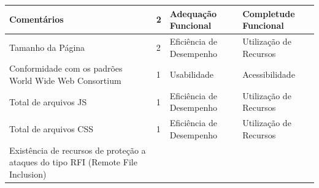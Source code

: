 \begin{apendicesenv}
\begin{longtable}{|p{175pt}|p{18pt}|p{110pt}|p{120pt}|}
 {\raggedright {Comentários}}
  	 	 & {\raggedright {2}}
  	 	 & {\raggedright {Adequação Funcional}}
  	 	 & {\raggedright {Completude Funcional}}\\
  	 	\hline
{\raggedright {Tamanho da Página}}
  	 	 & {\raggedright {2}}
  	 	 & {\raggedright {Eficiência de Desempenho}}
  	 	 & {\raggedright {Utilização de Recursos}}\\
  	 	\hline
{\raggedright {Conformidade com os padrões World Wide Web Consortium}}
  	 	 & {\raggedright {1}}
  	 	 & {\raggedright {Usabilidade}}
  	 	 & {\raggedright {Acessibilidade}}\\
  	 	\hline  
{\raggedright {Total de arquivos JS}}
  	 	 & {\raggedright {1}}
  	 	 & {\raggedright {Eficiência de Desempenho}}
  	 	 & {\raggedright {Utilização de Recursos}}\\
  	 	\hline
{\raggedright {Total de arquivos CSS}}
  	 	 & {\raggedright {1}}
  	 	 & {\raggedright {Eficiência de Desempenho}}
  	 	 & {\raggedright {Utilização de Recursos}}\\
  	 	\hline  
{\raggedright {Existência de recursos de proteção a ataques do tipo RFI (Remote File Inclusion)}}
  	 	

\end{longtable}
\end{apendicesenv}
